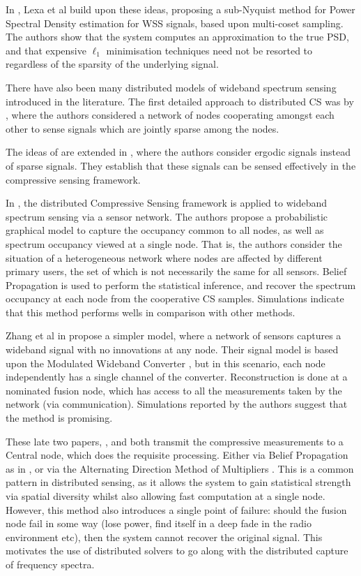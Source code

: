 In \cite{lexa2011compressive}, Lexa et al build upon these ideas, proposing a sub-Nyquist method for Power Spectral Density estimation for WSS signals, based upon multi-coset sampling. The authors show that the system computes an approximation to the true PSD, and that expensive \(\ell_1\) minimisation techniques need not be resorted to regardless of the sparsity of the underlying signal. 

There have also been many distributed models of wideband spectrum sensing introduced in the literature. The first detailed approach to distributed CS was by \cite{Duarte}, where the authors considered a network of nodes cooperating amongst each other to sense signals which are jointly sparse among the nodes.

The ideas of \cite{Duarte} are extended in \cite{Ma2014b}, where the authors consider ergodic signals instead of sparse signals. They establish that these signals can be sensed effectively in the compressive sensing framework.

In \citep{Zhang2011a}, the distributed Compressive Sensing framework is applied to wideband spectrum sensing via a sensor network. The authors propose a probabilistic graphical model to capture the occupancy common to all nodes, as well as spectrum occupancy viewed at a single node. That is, the authors consider the situation of a heterogeneous network where nodes are affected by different primary users, the set of which is not necessarily the same for all sensors. Belief Propagation is used to perform the statistical inference, and recover the spectrum occupancy at each node from the cooperative CS samples. Simulations indicate that this method performs wells in comparison with other methods.

Zhang et al in \cite{Zhang2011b} propose a simpler model, where a network of sensors captures a wideband signal with no innovations at any node. Their signal model is based upon the Modulated Wideband Converter \cite{Mishali2010}, but in this scenario, each node independently has a single channel of the converter. Reconstruction is done at a nominated fusion node, which has access to all the measurements taken by the network (via communication). Simulations reported by the authors suggest that the method is promising. 

These late two papers, \citep{Zhang2011a}, and \cite{Zhang2011b} both transmit the compressive measurements to a Central node, which does the requisite processing. Either via Belief Propagation as in \cite{Zhang2011a}, or via the Alternating Direction Method of Multipliers \cite{Zhang2011b}. This is a common pattern in distributed sensing, as it allows the system to gain statistical strength via spatial diversity whilst also allowing fast computation at a single node. However, this method also introduces a single point of failure: should the fusion node fail in some way (lose power, find itself in a deep fade in the radio environment etc), then the system cannot recover the original signal. This motivates the use of distributed solvers to go along with the distributed capture of frequency spectra.

